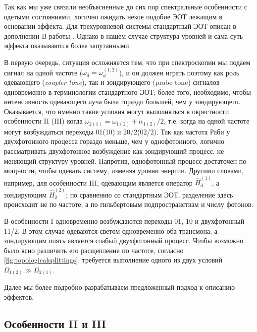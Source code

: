\documentclass[14pt, a4paper]{extreport}
\numberwithin{equation}{section}
\begin{document}
Так как мы уже связали необъясненные до сих пор спектральные особенности с одетыми состояниями, логично ожидать некое подобие ЭОТ лежащим в основании эффекта. Для трехуровневой системы стандартный ЭОТ описан в дополнении B работы \cite{fedorov2020light}. Однако в нашем случае структура уровней и сама суть эффекта оказываются более запутанными.

В первую очередь, ситуация осложняется тем, что при спектроскопии мы подаем сигнал на одной частоте ($\omega_d = \omega_d^{(1,2)}$), и он должен играть поэтому как роль одевающего (\foreignlanguage{english}{\textit{coupler tone}}), так и зондирующего (\foreignlanguage{english}{probe tone}) сигналов одновременно в терминологии стандартного ЭОТ; более того, необходимо, чтобы интенсивность одевающего луча была гораздо большей, чем у зондирующего. Оказывается, что именно такие условия могут выполняться в окрестности особенности II (III) когда $\omega_{2(1)} = \omega_{1(2)} + \alpha_{1(2)}/2$, т.е. когда на одной частоте могут возбуждаться переходы 01(10) и 20/2(02/2). Так как частота Раби у двухфотонного процесса гораздо меньше, чем у однофотонного, логично рассматривать двухфотонное возбуждение как зондирующий процесс, не меняющий структуру уровней. Напротив, однофотонный процесс достаточен по мощности, чтобы одевать систему, изменяя уровни энергии. Другими словами, например, для особенности III, одевающим является оператор $\hat H_d^{(1)}$, а зондирующим $\hat H_2^{(2)}$; по сравнению со стандартным ЭОТ, разделение здесь происходит не по частоте, а по гильбертовым подпространствам и числу фотонов.

В особенности I одновременно возбуждаются переходы 01, 10 и двухфотонный 11/2. В этом случае одеваются светом одновременно оба трансмона, а зондирующим опять является слабый двухфотонный процесс. Чтобы возможно было ясно различить его расщепление по частоте, согласно \autoref{fig:topologicalsplittings}, требуется выполнение одного из двух условий $\Omega_{1(2)} \gg \Omega_{2(1)}$.

Далее мы более подробно разрабатываем предложенный подход к описанию эффектов.

\subsection{Особенности II и III}
\end{document}
